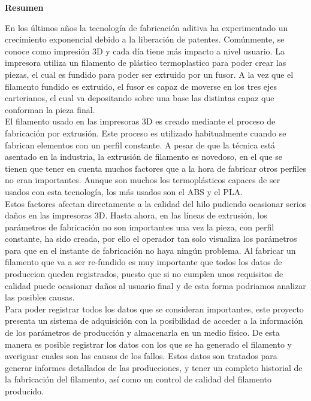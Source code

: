 
\thispagestyle{empty}
\begin{center}
    \Large
    \vspace{0.9cm}
    \textbf{Resumen}
\end{center}

En los últimos años la tecnología de fabricación aditiva ha experimentado un crecimiento exponencial debido a la liberación de patentes. Comúnmente, se conoce como impresión 3D y cada día tiene más impacto a nivel usuario. La impresora utiliza un filamento de plástico termoplastico para poder crear las piezas, el cual es fundido para poder ser extruido por un fusor. A la vez que el filamento fundido es extruido, el fusor es capaz de moverse en los tres ejes carterianos, el cual va depositando sobre una base las distintas capaz que conforman la pieza final.\\

El filamento usado en las impresoras 3D es creado mediante el proceso de fabricación por extrusión. Este proceso es utilizado habitualmente cuando se fabrican elementos con un perfil constante. A pesar de que la técnica está asentado en la industria, la extrusión de filamento es novedoso, en el que se tienen que tener en cuenta muchos factores que a la hora de fabricar otros perfiles no eran importantes. Aunque son muchos los termoplásticos capaces de ser usados con esta tecnología, los más usados son el ABS y el PLA.\\

Estos factores afectan directamente a la calidad del hilo pudiendo ocasionar serios daños en las impresoras 3D. Hasta ahora, en las líneas de extrusión, los parámetros de fabricación no son importantes una vez la pieza, con perfil constante, ha sido creada, por ello el operador tan solo visualiza los parámetros para que en el instante de fabricación no haya ningún problema. Al fabricar un filamento que va a ser re-fundido es muy importante que todos los datos de produccion queden registrados, puesto que si no cumplen unos requisitos de calidad puede ocasionar daños al usuario final y de esta forma podriamos analizar las posibles causas.\\

Para poder registrar todos los datos que se consideran importantes, este proyecto presenta un sistema de adquisición con la posibilidad de acceder a la información de los parámetros de producción y almacenarla en un medio físico. De esta manera es posible registrar los datos con los que se ha generado el filamento y averiguar cuales son las causas de los fallos. Estos datos son tratados para generar informes detallados de las producciones, y tener un completo historial de la fabricación del filamento, así como un control de calidad del filamento producido.\\

